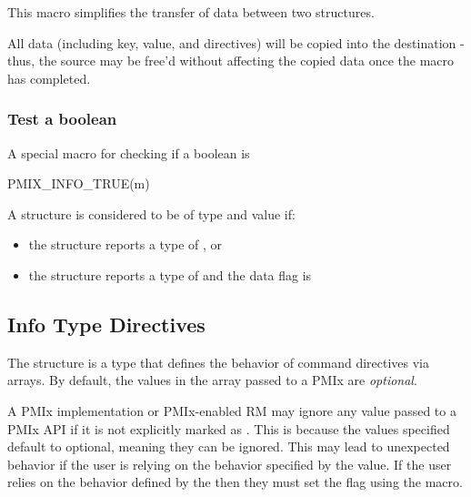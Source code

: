 This macro simplifies the transfer of data between two structures.

\adviceuserstart
All data (including key, value, and directives) will be copied into the destination  - thus, the source  may be free'd without affecting the copied data once the macro has completed.
\adviceuserend


\subsubsection{Test a boolean }

A special macro for checking if a boolean  is 

\cspecificstart
\begin{codepar}
PMIX_INFO_TRUE(m)
\end{codepar}
\cspecificend

\begin{arglist}
\end{arglist}

A  structure is considered to be of type  and value  if:

\begin{itemize}
    \item the structure reports a type of , or
    \item the structure reports a type of  and the data flag is 
\end{itemize}

\subsection{Info Type Directives}

The  structure is a  type that defines the behavior of command directives via  arrays.
By default, the values in the  array passed to a PMIx are \emph{optional}.

\adviceuserstart
A PMIx implementation or PMIx-enabled \ac{RM} may ignore any  value passed to a \ac{PMIx} \ac{API} if it is not explicitly marked as .
This is because the values specified default to optional, meaning they can be ignored.
This may lead to unexpected behavior if the user is relying on the behavior specified by the  value.
If the user relies on the behavior defined by the  then they must set the  flag using the  macro.
\adviceuserend

